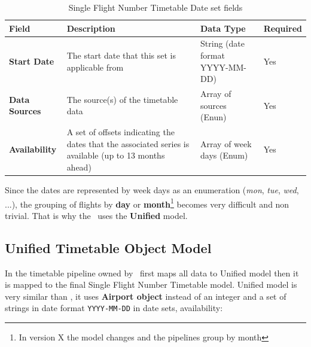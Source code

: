 \begin{table}[H]
\centering
\begin{tabular}{|>{\raggedright\arraybackslash}p{2.5cm}|>{\raggedright\arraybackslash}p{4.7cm}|>{\raggedright\arraybackslash}p{3cm}|>{\raggedright\arraybackslash}p{2cm}|}
\hline
\textbf{Field}        & \textbf{Description}                                                                                  & \textbf{Data Type}              & \textbf{Required} \\ \hline
\textbf{Start Date}   & The start date that this set is applicable from                                                       & String (date format YYYY-MM-DD) & Yes               \\ \hline
\textbf{Data Sources} & The source(s) of the timetable data                                                                   & Array of sources (Enun)         & Yes               \\ \hline
\textbf{Availability} & A set of offsets indicating the dates that the associated series is available (up to 13 months ahead) & Array of week days (Enum)       & Yes               \\ \hline
\end{tabular}
\caption{Single Flight Number Timetable Date set fields}
\label{sfn-date-set}
\end{table}

Since the dates are represented by week days as an enumeration (\textit{mon}, \textit{tue}, \textit{wed}, ...), the grouping of flights by \textbf{day} or \textbf{month}\footnote{In version X the model changes and the pipelines group by month} becomes very difficult and non trivial. That is why the \thesis\ uses the \textbf{Unified} model.

\subsection{Unified Timetable Object Model} \label{unified-model}

In the timetable pipeline owned by \squad\ first maps all data to Unified model then it is mapped to the final Single Flight Number Timetable model. Unified model is very similar than , it uses \textbf{Airport object} instead of an integer and a set of strings in date format \texttt{YYYY-MM-DD} in date sets, availability:

